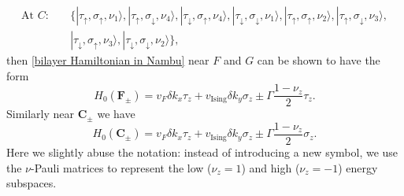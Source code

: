 \begin{subappendices}
\begin{align*}
		\text{At }C: & \quad \{|\tau_\uparrow,\sigma_\uparrow,\nu_1\rangle,|\tau_\uparrow,\sigma_\downarrow,\nu_4\rangle,|\tau_\downarrow,\sigma_\uparrow,\nu_4\rangle,|\tau_\downarrow,\sigma_\downarrow,\nu_1\rangle,|\tau_\uparrow,\sigma_\uparrow,\nu_2\rangle,|\tau_\uparrow,\sigma_\downarrow,\nu_3\rangle,  \\
		             & \quad|\tau_\downarrow,\sigma_\uparrow,\nu_3\rangle,|\tau_\downarrow,\sigma_\downarrow,\nu_2\rangle\},
	\end{align*}
	then \eqref{bilayer Hamiltonian in Nambu} near $F$ and $G$ can be shown to have the form
	\begin{equation}\label{H0 F,G}
		H_0(\bm{F}_\pm)=v_F\delta k_x\tau_z+v_{\text{Ising}}\delta k_y\sigma_z\pm\Gamma\dfrac{1-\nu_z}{2}\tau_z.
	\end{equation}
	Similarly near $\bm{C}_\pm$ we have
	\begin{equation}\label{H0 C,D}
		H_0(\bm{C}_\pm)=v_F\delta k_x\tau_z+v_{\text{Ising}}\delta k_y\sigma_z\pm\Gamma\dfrac{1-\nu_z}{2}\sigma_z.
	\end{equation}
	Here we slightly abuse the notation: instead of introducing a new symbol, we use the $\nu$-Pauli matrices to represent the low ($\nu_z=1$) and high ($\nu_z=-1$) energy subspaces.

\end{subappendices}
